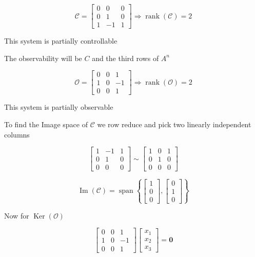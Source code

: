 \documentclass{article}
\begin{document}
\begin{enumerate}[label=\alph*)]
\[
\mathcal{C} = 
\begin{bmatrix}
    0 & 0 & 0 \\
    0 & 1 & 0 \\
    1 & -1 & 1
\end{bmatrix}
\Rightarrow \operatorname{rank}(\mathcal{C}) = 2
\]

This system is partially controllable

The observability will be $C$ and the third rows of $A^n$

\[
\mathcal{O} = 
\begin{bmatrix}
    0 & 0 & 1 \\
    1 & 0 & -1 \\
    0 & 0 & 1
\end{bmatrix}
\Rightarrow \operatorname{rank}(\mathcal{O})= 2
\]

This system is partially observable

To find the Image space of $\mathcal{C}$ we row reduce and pick two linearly independent columns

\[
\begin{bmatrix}
    1 & -1 & 1 \\
    0 & 1 & 0 \\
    0 & 0 & 0
\end{bmatrix}
\sim
\begin{bmatrix}
    1 & 0 & 1 \\
    0 & 1 & 0 \\
    0 & 0 & 0
\end{bmatrix}
\]

\[
\operatorname{Im}(\mathcal{C}) = \operatorname{span}
\left\{
\begin{bmatrix}
    1 \\
    0 \\
    0
\end{bmatrix}
,
\begin{bmatrix}
    0 \\
    1 \\
    0
\end{bmatrix}
\right\}
\]

Now for $\operatorname{Ker}(\mathcal{O})$

\[
\begin{bmatrix}
    0 & 0 & 1 \\
    1 & 0 & -1 \\
    0 & 0 & 1
\end{bmatrix}
\begin{bmatrix}
    x_1 \\
    x_2 \\
    x_3
\end{bmatrix}
= \mathbf{0}
\]


\end{enumerate}
\end{document}
